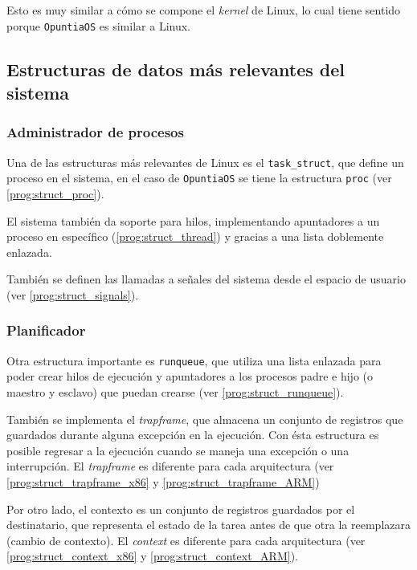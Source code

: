 		Esto es muy similar a cómo se compone el \textit{kernel} de Linux, lo cual tiene sentido porque \texttt{OpuntiaOS} es similar a Linux.
		
	
	
	
\clearpage
\subsection{Estructuras de datos más relevantes del sistema}
	\subsubsection{Administrador de procesos}
		Una de las estructuras más relevantes de Linux es el \texttt{task\_struct}, que define un proceso en el sistema, en el caso de \texttt{OpuntiaOS} se tiene la estructura \texttt{proc} (ver \autoref{prog:struct_proc}).
		
		El sistema también da soporte para hilos, implementando apuntadores a un proceso en específico (\autoref{prog:struct_thread}) y gracias a una lista doblemente enlazada.
		
		También se definen las llamadas a señales del sistema desde el espacio de usuario (ver \autoref{prog:struct_signals}).
		
		
		
		
	\subsubsection{Planificador}
		Otra estructura importante es \texttt{runqueue}, que utiliza una lista enlazada para poder crear hilos de ejecución y apuntadores a los procesos padre e hijo (o maestro y esclavo) que puedan crearse (ver \autoref{prog:struct_runqueue}).
		
		También se implementa el \textit{trapframe}, que almacena un conjunto de registros que guardados durante alguna excepción en la ejecución. Con ésta estructura es posible regresar a la ejecución cuando se maneja una excepción o una interrupción. El \textit{trapframe} es diferente para cada arquitectura (ver \autoref{prog:struct_trapframe_x86} y \autoref{prog:struct_trapframe_ARM})
		
		Por otro lado, el contexto es un conjunto de registros guardados por el destinatario, que representa el estado de la tarea antes de que otra la reemplazara (cambio de contexto). El \textit{context} es diferente para cada arquitectura (ver \autoref{prog:struct_context_x86} y \autoref{prog:struct_context_ARM}).
		
